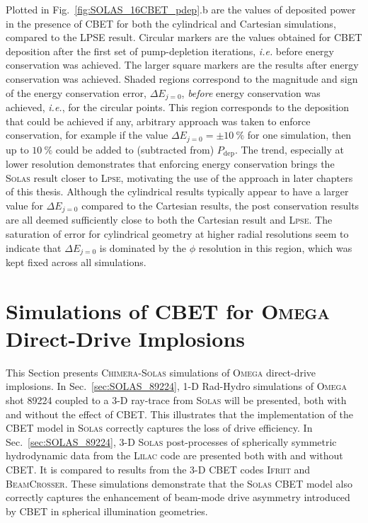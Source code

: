 Plotted in Fig.~\ref{fig:SOLAS_16CBET_pdep}.b are the values of deposited power in the presence of \ac{CBET} for both the cylindrical and Cartesian simulations, compared to the \textsc{LPSE} result.
Circular markers are the values obtained for \ac{CBET} deposition after the first set of pump-depletion iterations, \textit{i.e.} before energy conservation was achieved.
The larger square markers are the results after energy conservation was achieved.
Shaded regions correspond to the magnitude and sign of the energy conservation error, $\Delta E_{j=0}$, \textit{before} energy conservation was achieved, \textit{i.e.}, for the circular points.
This region corresponds to the deposition that could be achieved if any, arbitrary approach was taken to enforce conservation, for example if the value $\Delta E_{j=0}=\pm10\ \%$ for one simulation, then up to $10\ \%$ could be added to (subtracted from) $P_{\text{dep}}$.
The trend, especially at lower resolution demonstrates that enforcing energy conservation brings the \textsc{Solas} result closer to \textsc{Lpse}, motivating the use of the approach in later chapters of this thesis.
Although the cylindrical results typically appear to have a larger value for $\Delta E_{j=0}$ compared to the Cartesian results, the post conservation results are all deemed sufficiently close to both the Cartesian result and \textsc{Lpse}.
The saturation of error for cylindrical geometry at higher radial resolutions seem to indicate that $\Delta E_{j=0}$ is dominated by the $\phi$ resolution in this region, which  was kept fixed across all simulations.

\section{Simulations of CBET for \textsc{Omega} Direct-Drive Implosions}

This Section presents \textsc{Chimera}-\textsc{Solas} simulations of \textsc{Omega} direct-drive implosions.
In Sec.~\ref{sec:SOLAS_89224}, 1-D \ac{Rad-Hydro} simulations of \textsc{Omega} shot 89224 coupled to a 3-D ray-trace from \textsc{Solas} will be presented, both with and without the effect of \ac{CBET}.
This illustrates that the implementation of the \ac{CBET} model in \textsc{Solas} correctly captures the loss of drive efficiency.
In Sec.~\ref{sec:SOLAS_89224}, 3-D \textsc{Solas} post-processes of spherically symmetric hydrodynamic data from the \textsc{Lilac} code are presented both with and without \ac{CBET}.
It is compared to results from the 3-D \ac{CBET} codes \textsc{Ifriit} and \textsc{BeamCrosser}.
These simulations demonstrate that the \textsc{Solas} \ac{CBET} model also correctly captures the enhancement of beam-mode drive asymmetry introduced by \ac{CBET} in spherical illumination geometries.

